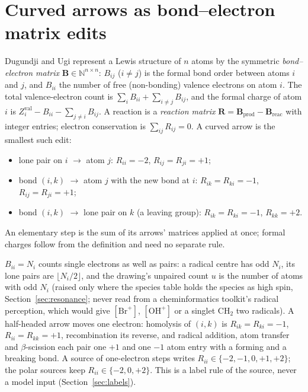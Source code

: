 \documentclass[11pt,a4paper]{article}
\newcommand{\vb}[1]{\bm{#1}}
\newcommand{\set}[1]{\{#1\}}
\begin{document}
\section{Curved arrows as bond--electron matrix edits}
\label{sec:be}
Dugundji and Ugi \cite{ugi} represent a Lewis structure of $n$ atoms by the symmetric \emph{bond--electron matrix} $\vb{B}\in\mathbb{N}^{n\times n}$: $B_{ij}$ ($i\ne j$) is the formal bond order between atoms $i$ and $j$, and $B_{ii}$ the number of free (non-bonding) valence electrons on atom $i$. The total valence-electron count is $\sum_i B_{ii}+\sum_{i\ne j}B_{ij}$, and the formal charge of atom $i$ is $Z^{\mathrm{val}}_i-B_{ii}-\sum_{j\ne i}B_{ij}$. A reaction is a \emph{reaction matrix} $\vb{R}=\vb{B}_{\mathrm{prod}}-\vb{B}_{\mathrm{reac}}$ with integer entries; electron conservation is $\sum_{ij}R_{ij}=0$. A curved arrow is the smallest such edit:
\begin{itemize}[nosep]
\item lone pair on $i$ $\to$ atom $j$: $R_{ii}=-2$, $R_{ij}=R_{ji}=+1$;
\item bond $(i,k)$ $\to$ atom $j$ with the new bond at $i$: $R_{ik}=R_{ki}=-1$, $R_{ij}=R_{ji}=+1$;
\item bond $(i,k)$ $\to$ lone pair on $k$ (a leaving group): $R_{ik}=R_{ki}=-1$, $R_{kk}=+2$.
\end{itemize}
An elementary step is the sum of its arrows' matrices applied at once; formal charges follow from the definition and need no separate rule.

$B_{ii}=N_i$ counts single electrons as well as pairs: a radical centre has odd $N_i$, its lone pairs are $\lfloor N_i/2\rfloor$, and the drawing's unpaired count $u$ is the number of atoms with odd $N_i$ (raised only where the species table holds the species as high spin, Section~\ref{sec:resonance}; never read from a cheminformatics toolkit's radical perception, which would give $[\mathrm{Br}^+]$, $[\mathrm{OH}^+]$ or a singlet CH$_2$ two radicals). A half-headed arrow moves one electron: homolysis of $(i,k)$ is $R_{ik}=R_{ki}=-1$, $R_{ii}=R_{kk}=+1$, recombination its reverse, and radical addition, atom transfer and $\beta$-scission each pair one $+1$ and one $-1$ atom entry with a forming and a breaking bond. A source of one-electron steps writes $R_{ii}\in\set{-2,-1,0,+1,+2}$; the polar sources keep $R_{ii}\in\set{-2,0,+2}$. This is a label rule of the source, never a model input (Section~\ref{sec:labels}).
\end{document}
